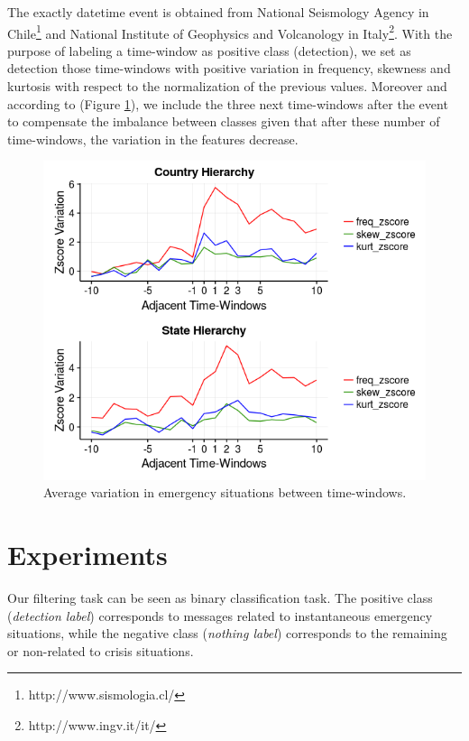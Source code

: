 \documentclass[sigconf]{acmart}
\begin{document}
The exactly datetime event is obtained from National Seismology Agency in Chile\footnote{http://www.sismologia.cl/} and 
National Institute of Geophysics and Volcanology in Italy\footnote{http://www.ingv.it/it/}. With the purpose of labeling a time-window as positive class (detection), we set as detection those time-windows with positive variation in frequency, skewness and kurtosis with respect to the normalization of the previous values. Moreover and according to (Figure \ref{fig:labeled}), we include the three next time-windows after the event to compensate the imbalance between classes given that after these number of time-windows, the variation in the features decrease.


\begin{figure}
	\centering
	\includegraphics[width=\columnwidth]{img/labeled2.png}
	\caption{Average variation in emergency situations between time-windows.}
	\label{fig:labeled}
\end{figure}



\section{Experiments}

Our filtering task can be seen as binary classification task. The positive class (\textit{detection label}) corresponds to messages related to instantaneous emergency situations, while the negative class (\textit{nothing label}) corresponds to the remaining or non-related to crisis situations.
\end{document}
